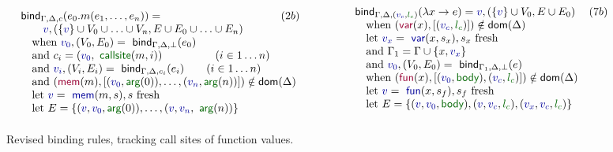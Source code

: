 \documentclass[sigplan,10pt,review,anonymous]{acmart}\settopmatter{printfolios=true,printccs=false,printacmref=false}
\theoremstyle{plain}
\theoremstyle{definition}
\newcommand{\ident}[1]{\textnormal{\sffamily #1}}
\newcommand{\bndclr}[1]{\textcolor{kvdclr}{#1}}
\newcommand{\blblclr}[1]{\textcolor{numclr}{#1}}
\newcommand{\bnd}[1]{\textnormal{\textcolor{kvdclr}{\sffamily #1}}}
\newcommand{\bknd}[1]{\textnormal{\textcolor{prepclr}{\sffamily #1}}}
\newcommand{\blbl}[1]{\textnormal{\textcolor{numclr}{\sffamily #1}}}
\begin{document}
\begin{figure}[t]
\vspace{-0.5em}
\begin{equation*}
\begin{array}{ll}
\ident{bind}_{\Gamma, \Delta, c}(e_0.m(e_1, \ldots, e_n)) = &(2b)\\ 
\qquad \bndclr{v}, (\{\bndclr{v}\} \cup V_0 \cup \ldots \cup V_n, E \cup E_0 \cup \ldots \cup E_n)\\
\quad \textnormal{when}~\bndclr{v_0}, (V_0, E_0) = \ident{bind}_{\Gamma, \Delta, \bot}(e_0)\\
\quad \textnormal{and}~c_i = (\bndclr{v_0}, \blbl{callsite}(m,i))\hspace{4.8em} (i \in 1\ldots n)\\
\quad \textnormal{and}~\bndclr{v_i}, (V_i, E_i) = \ident{bind}_{\Gamma, \Delta, c_i}(e_i)\qquad (i\in 1\ldots n)\\
\quad \textnormal{and}~(\bknd{mem}(m),[(\bndclr{v_0}, \blbl{arg}(0)), \ldots, (\bndclr{v_n}, \blbl{arg}(n))]) \notin \ident{dom}(\Delta)\hspace{-200em}.\\
\quad \textnormal{let}~\bndclr{v} = \bnd{mem}(m, s), s~\textnormal{fresh}\\
\quad \textnormal{let}~E = \{ (\bndclr{v}, \bndclr{v_0}, \blbl{arg}(0)), \ldots, (\bndclr{v},\bndclr{v_n}, \blbl{arg}(n)) \}
\end{array}
\qquad\qquad
\begin{array}{ll}
\ident{bind}_{\Gamma, \Delta, (\bndclr{v_c}, \blblclr{l_c} )}(\lambda x \rightarrow e) = \bndclr{v}, (\{\bndclr{v}\} \cup V_0, E \cup E_0)&(7b)\\
\quad \textnormal{when}~(\bknd{var}(x),[(\bndclr{v_c}, \blblclr{l_c} )])\notin \ident{dom}(\Delta)\\
\quad \textnormal{let}~\bndclr{v_x} = \bnd{var}(x, s_x), s_x~\textnormal{fresh}\\
\quad \textnormal{and}~\Gamma_1 = \Gamma \cup \{ x, \bndclr{v_x} \}\\
\quad \textnormal{and}~\bndclr{v_0}, (V_0, E_0) = \ident{bind}_{\Gamma_1, \Delta, \bot}(e)\\
\quad \textnormal{when}~(\bknd{fun}(x),[(\bndclr{v_0}, \blbl{body}), (\bndclr{v_c}, \blblclr{l_c} )])\notin \ident{dom}(\Delta)\\
\quad \textnormal{let}~\bndclr{v} = \bnd{fun}(x, s_f), s_f~\textnormal{fresh}\\
\quad \textnormal{let}~E = \{ (\bndclr{v},\bndclr{v_0},\blbl{body}), (\bndclr{v},\bndclr{v_c},\blblclr{l_c}), (\bndclr{v_x},\bndclr{v_c},\blblclr{l_c}) \}
\\[0.75em]
\end{array}
\end{equation*}
\vspace{-0.5em}
\caption{Revised binding rules, tracking call sites of function values.} 
\label{fig:binding-rules-callsite}
\vspace{-0.5em}
\end{figure}
\end{document}
